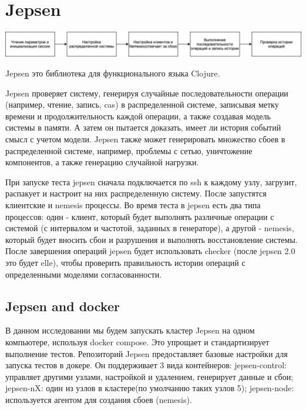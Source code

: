 \documentclass[12pt,  openany]{book}
\begin{document}
\section{Jepsen}
\includegraphics[scale=0.175]{jepsen.jpeg}
\par
Jepsen это библиотека для функционального языка Clojure.
\par
Jepsen проверяет систему, генерируя случайные последовательности операции (например, чтение, запись, cas) в распределенной системе, записывая метку времени и продолжительность каждой операции, а также создавая модель системы в памяти. А затем он пытается доказать, имеет ли история событий смысл с учетом модели.
Jepsen также может генерировать множество сбоев в распределенной системе, например, проблемы с сетью, уничтожение компонентов, а также генерацию случайной нагрузки.
\par
При запуске теста jepsen сначала подключается по ssh к каждому узлу, загрузит, распакует и настроит на них распределенную систему.
После запустятся клиентские и nemesis процессы. Во время теста в jepsen есть два типа процессов: один - клиент, который будет выполнять различные операции с системой (с интервалом и частотой, заданных в генераторе), а другой - nemesis, который будет вносить сбои и разрушения и выполнять восстановление системы. После завершения операций jepsen будет использовать checker (после jepsen 2.0 это будет elle), чтобы проверить правильность истории операций с определенными моделями согласованности.

\subsection{Jepsen and docker}
В данном исследовании мы будем запускать кластер Jepsen на одном компьютере, используя docker compose. 
Это упрощает и стандартизирует выполнение тестов. 
Репозиторий Jepsen предоставляет базовые настройки для запуска тестов в докере. Он поддерживает 3 вида контейнеров:  \newline
jepsen-control:  управляет другими узлами, настройкой и удалением, генерирует данные и сбои; \newline
jepsen-nX:  один из узлов в кластере(по умолчанию таких узлов 5); \newline
jepsen-node: используется агентом для создания сбоев (nemesis). 
\end{document}
